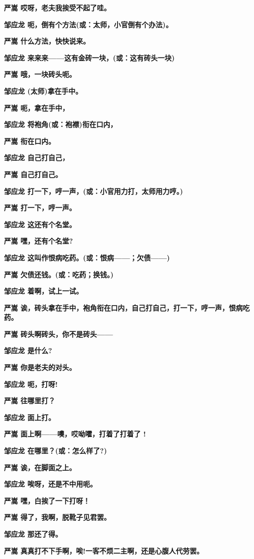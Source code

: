 \textbf{严嵩 哎呀，老夫我挨受不起了哇。}

\textbf{邹应龙 呃，倒有个方法(或：太师，小官倒有个办法)。}

\textbf{严嵩 什么方法，快快说来。}

\textbf{邹应龙 来来来------这有金砖一块，(或：这有砖头一块)}

\textbf{严嵩 哦，一块砖头呃。}

\textbf{邹应龙 (太师)拿在手中。}

\textbf{严嵩 呃，拿在手中，}

\textbf{邹应龙 将袍角(或：袍襟)衔在口内，}

\textbf{严嵩 衔在口内。}

\textbf{邹应龙 自己打自己，}

\textbf{严嵩 自己打自己。}

\textbf{邹应龙 打一下，哼一声，(或：小官用力打，太师用力哼。)}

\textbf{严嵩 打一下，哼一声。}

\textbf{邹应龙 这还有个名堂。}

\textbf{严嵩 嘿，还有个名堂?}

\textbf{邹应龙 这叫作恨病吃药。(或：恨病------；欠债------)}

\textbf{严嵩 欠债还钱。(或：吃药；换钱。)}

\textbf{邹应龙 着啊，试上一试。}

\textbf{严嵩
诶，砖头拿在手中，袍角衔在口内，自己打自己，打一下，哼一声，恨病吃药。}

\textbf{严嵩 砖头啊砖头，你不是砖头------}

\textbf{邹应龙 是什么?}

\textbf{严嵩 你是老夫的对头。}

\textbf{邹应龙 呃，打呀!}

\textbf{严嵩 往哪里打？}

\textbf{邹应龙 面上打。}

\textbf{严嵩 面上啊------噢，哎呦嚯，打着了打着了 !}

\textbf{邹应龙 在哪里？(或：怎么样了?)}

\textbf{严嵩 诶，在脚面之上。}

\textbf{邹应龙 唉呀，还是不中用呃。}

\textbf{严嵩 嘿，白挨了一下打呀！}

\textbf{严嵩 得了，我啊，脱靴子见君罢。}

\textbf{邹应龙 那还了得。}

\textbf{严嵩 真真打不下手啊，唉!一客不烦二主啊，还是心腹人代劳罢。}

